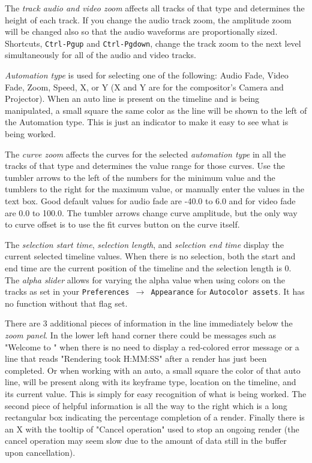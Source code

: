 The \emph{track audio and video zoom} affects all tracks of that type and determines the height of each track. 
If you change the audio track zoom, the amplitude zoom will be changed also so that the audio waveforms
are proportionally sized.
Shortcuts, \texttt{Ctrl-Pgup} and \texttt{Ctrl-Pgdown}, change the track zoom to the next level simultaneously for all of the audio and video tracks.

\emph{Automation type} is used for selecting one of the following: Audio Fade, Video Fade, Zoom, Speed, X, or Y (X and Y are for the compositor's Camera and Projector).  When an auto line is present on
the timeline and is being manipulated, a small square the same color as the line will be shown to 
the left of the Automation type.  This is just an indicator to make it easy to see what is being worked.
 
The \emph{curve zoom} affects the curves for the selected \emph{automation type} in all the tracks of that type and determines the value range for those curves. 
Use the tumbler arrows to the left of the numbers for the minimum value and the tumblers to the right for the maximum value, or manually enter the values in the text box. 
Good default values for audio fade are -40.0 to 6.0 and for video fade are 0.0 to 100.0. 
The tumbler arrows change curve amplitude, but the only way to curve offset is to use the fit curves button on the curve itself.

The \emph{selection start time}, \emph{selection length}, and \emph{selection end time} display the current selected timeline values. When there is no selection, both the start and end time are the current
position of the timeline and the selection length is 0.
The \emph{alpha slider} allows for varying the alpha value when using colors on the tracks as set in your \texttt{Preferences $\rightarrow$ Appearance} for \texttt{Autocolor assets}.  
It has no function without that flag set.

There are 3 additional pieces of information in the line immediately below the \textit{zoom panel}.
In the lower left hand corner there could be messages such as "Welcome to \CGG{}" when there is no 
need to display a red-colored error message or a line that reads "Rendering took H:MM:SS" after a render
has just been completed. Or when working with an auto, a small square the color of that auto line, will be
present along with its keyframe type, location on the timeline, and its current value.  This is simply
for easy recognition of what is being worked. The second piece of helpful information is all the way to
the right which is a long rectangular box indicating the percentage completion of a render. Finally
there is an X with the tooltip of "Cancel operation" used to stop an ongoing render
(the cancel operation may seem slow due to the amount of data still in the buffer upon cancellation).

